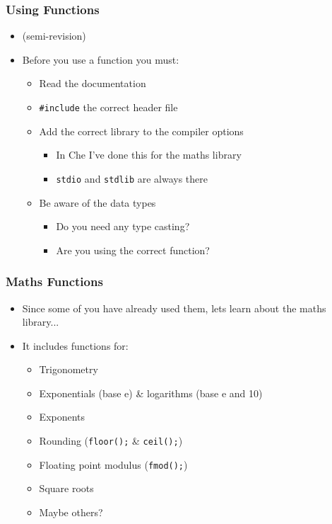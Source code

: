 \documentclass[14pt]{beamer}
\begin{document}
\begin{frame}
\frametitle{Using Functions}
\begin{itemize}
\item (semi-revision)
\item Before you use a function you must:
	\begin{itemize}
		\item Read the documentation
		\item \texttt{\#include} the correct header file
		\item Add the correct library to the compiler options
			\begin{itemize}
				\item In Che I've done this for the maths library
				\item \texttt{stdio} and \texttt{stdlib} are always there
			\end{itemize}
		\item Be aware of the data types
			\begin{itemize}
				\item Do you need any type casting?
				\item Are you using the correct function?
			\end{itemize}
	\end{itemize}
\end{itemize}
\end{frame}

\begin{frame}
\frametitle{Maths Functions}
\begin{itemize}
\item Since some of you have already used them, lets learn about the maths library...
\item It includes functions for:
	\begin{itemize}
		\item Trigonometry
		\item Exponentials (base e) \& logarithms (base e and 10)
		\item Exponents
		\item Rounding (\texttt{floor();} \& \texttt{ceil();})
		\item Floating point modulus (\texttt{fmod();})
		\item Square roots
		\item Maybe others?
	\end{itemize}
\end{itemize}
\end{frame}
\end{document}
